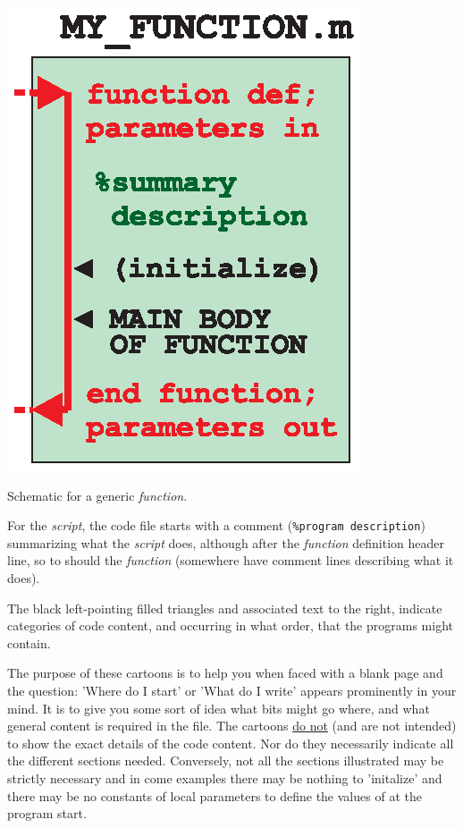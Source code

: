 \documentclass{tufte-book} %
\begin{document}
\begin{marginfigure}[-0.0in]
\includegraphics[width=\linewidth]{ch0-function.eps}
\caption{Schematic for a generic \textit{function}.}
\label{fig:ch0-function}
\end{marginfigure}

For the \textit{script}, the code file starts with a comment (\textcolor[rgb]{0,0.501961,0}{\texttt{\%program description}}) summarizing what the \textit{script} does, although after the \textit{function} definition header line, so to should the \textit{function} (somewhere have comment lines describing what it does).

The black left-pointing filled triangles and associated text to the right, indicate categories of code content, and occurring in what order, that the programs might contain.

The purpose of these cartoons is to help you when faced with a blank page and the question: 'Where do I start' or 'What do I write' appears prominently in your mind. It is to give you some sort of idea what bits might go where, and what general content is required in the file. The cartoons \uline{do not} (and are not intended) to show the exact details of the code content. Nor do they necessarily indicate all the different sections needed. Conversely, not all the sections illustrated may be strictly necessary and in come examples there may be nothing to 'initalize' and there may be no constants of local parameters to define the values of at the program start.
\end{document}
